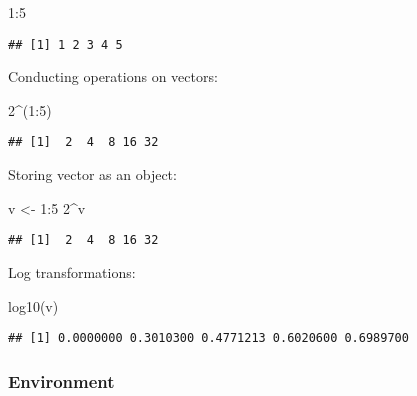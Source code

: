 \documentclass[
]{article}
\newenvironment{Shaded}{\begin{snugshade}}{\end{snugshade}}
\newcommand{\DecValTok}[1]{\textcolor[rgb]{0.00,0.00,0.81}{#1}}
\newcommand{\FunctionTok}[1]{\textcolor[rgb]{0.00,0.00,0.00}{#1}}
\newcommand{\NormalTok}[1]{#1}
\newcommand{\OtherTok}[1]{\textcolor[rgb]{0.56,0.35,0.01}{#1}}
\newcommand{\SpecialCharTok}[1]{\textcolor[rgb]{0.00,0.00,0.00}{#1}}
\begin{document}
\begin{Shaded}
\begin{Highlighting}[]
\DecValTok{1}\SpecialCharTok{:}\DecValTok{5}
\end{Highlighting}
\end{Shaded}

\begin{verbatim}
## [1] 1 2 3 4 5
\end{verbatim}

Conducting operations on vectors:

\begin{Shaded}
\begin{Highlighting}[]
\DecValTok{2}\SpecialCharTok{\^{}}\NormalTok{(}\DecValTok{1}\SpecialCharTok{:}\DecValTok{5}\NormalTok{)}
\end{Highlighting}
\end{Shaded}

\begin{verbatim}
## [1]  2  4  8 16 32
\end{verbatim}

Storing vector as an object:

\begin{Shaded}
\begin{Highlighting}[]
\NormalTok{v }\OtherTok{\textless{}{-}} \DecValTok{1}\SpecialCharTok{:}\DecValTok{5}
\DecValTok{2}\SpecialCharTok{\^{}}\NormalTok{v}
\end{Highlighting}
\end{Shaded}

\begin{verbatim}
## [1]  2  4  8 16 32
\end{verbatim}

Log transformations:

\begin{Shaded}
\begin{Highlighting}[]
\FunctionTok{log10}\NormalTok{(v)}
\end{Highlighting}
\end{Shaded}

\begin{verbatim}
## [1] 0.0000000 0.3010300 0.4771213 0.6020600 0.6989700
\end{verbatim}

\hypertarget{environment}{%
\subsubsection{Environment}\label{environment}}
\end{document}

